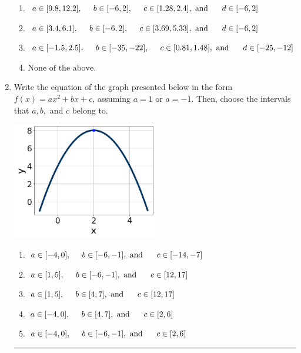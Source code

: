 \documentclass[14pt]{extbook}
\newcommand{\litem}[1]{\item#1\hspace*{-1cm}\rule{\textwidth}{0.4pt}}
\begin{document}
\begin{enumerate}
{\begin{enumerate}[label=\Alph*.]
\item \( a \in [9.8, 12.2], \hspace*{5mm} b \in [-6, 2], \hspace*{5mm} c \in [1.28, 2.4], \text{ and } \hspace*{5mm} d \in [-6, 2] \)
\item \( a \in [3.4, 6.1], \hspace*{5mm} b \in [-6, 2], \hspace*{5mm} c \in [3.69, 5.33], \text{ and } \hspace*{5mm} d \in [-6, 2] \)
\item \( a \in [-1.5, 2.5], \hspace*{5mm} b \in [-35, -22], \hspace*{5mm} c \in [0.81, 1.48], \text{ and } \hspace*{5mm} d \in [-25, -12] \)
\item \( \text{None of the above.} \)

\end{enumerate} }
\litem{
Write the equation of the graph presented below in the form $f(x)=ax^2+bx+c$, assuming  $a=1$ or $a=-1$. Then, choose the intervals that $a, b,$ and $c$ belong to.
\begin{center}
    \includegraphics[width=0.5\textwidth]{../Figures/quadraticGraphToEquationCopyC.png}
\end{center}
\begin{enumerate}[label=\Alph*.]
\item \( a \in [-4, 0], \hspace*{5mm} b \in [-6, -1], \text{ and } \hspace*{5mm} c \in [-14, -7] \)
\item \( a \in [1, 5], \hspace*{5mm} b \in [-6, -1], \text{ and } \hspace*{5mm} c \in [12, 17] \)
\item \( a \in [1, 5], \hspace*{5mm} b \in [4, 7], \text{ and } \hspace*{5mm} c \in [12, 17] \)
\item \( a \in [-4, 0], \hspace*{5mm} b \in [4, 7], \text{ and } \hspace*{5mm} c \in [2, 6] \)
\item \( a \in [-4, 0], \hspace*{5mm} b \in [-6, -1], \text{ and } \hspace*{5mm} c \in [2, 6] \)


\end{enumerate}}
\end{enumerate}
\end{document}

